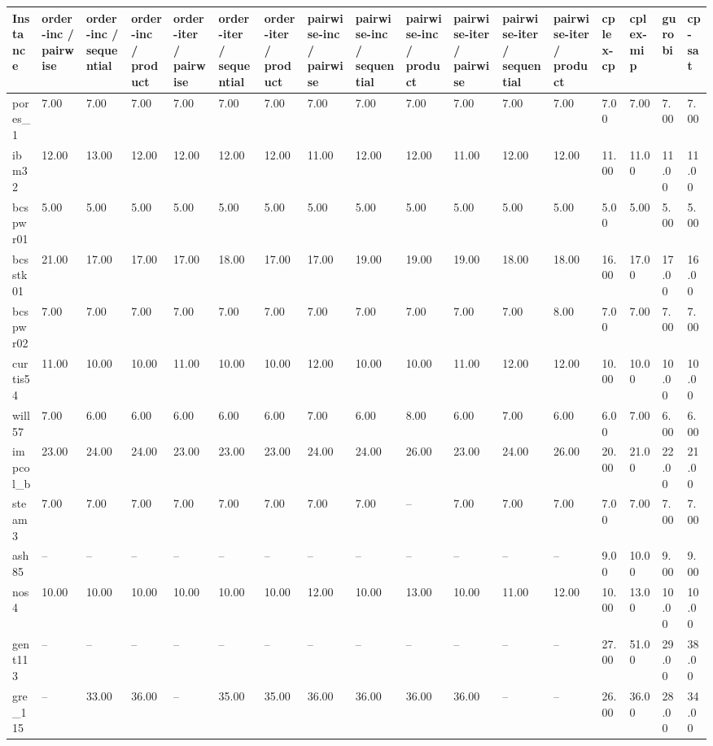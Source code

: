 \begin{tabular}{lllllllllllllllll}
\hline
Instance & order-inc / pairwise & order-inc / sequential & order-inc / product & order-iter / pairwise & order-iter / sequential & order-iter / product & pairwise-inc / pairwise & pairwise-inc / sequential & pairwise-inc / product & pairwise-iter / pairwise & pairwise-iter / sequential & pairwise-iter / product & cplex-cp & cplex-mip & gurobi & cp-sat \\
\hline
pores\_1 & 7.00 & 7.00 & 7.00 & 7.00 & 7.00 & 7.00 & 7.00 & 7.00 & 7.00 & 7.00 & 7.00 & 7.00 & 7.00 & 7.00 & 7.00 & 7.00 \\
ibm32 & 12.00 & 13.00 & 12.00 & 12.00 & 12.00 & 12.00 & 11.00 & 12.00 & 12.00 & 11.00 & 12.00 & 12.00 & 11.00 & 11.00 & 11.00 & 11.00 \\
bcspwr01 & 5.00 & 5.00 & 5.00 & 5.00 & 5.00 & 5.00 & 5.00 & 5.00 & 5.00 & 5.00 & 5.00 & 5.00 & 5.00 & 5.00 & 5.00 & 5.00 \\
bcsstk01 & 21.00 & 17.00 & 17.00 & 17.00 & 18.00 & 17.00 & 17.00 & 19.00 & 19.00 & 19.00 & 18.00 & 18.00 & 16.00 & 17.00 & 17.00 & 16.00 \\
bcspwr02 & 7.00 & 7.00 & 7.00 & 7.00 & 7.00 & 7.00 & 7.00 & 7.00 & 7.00 & 7.00 & 7.00 & 8.00 & 7.00 & 7.00 & 7.00 & 7.00 \\
curtis54 & 11.00 & 10.00 & 10.00 & 11.00 & 10.00 & 10.00 & 12.00 & 10.00 & 10.00 & 11.00 & 12.00 & 12.00 & 10.00 & 10.00 & 10.00 & 10.00 \\
will57 & 7.00 & 6.00 & 6.00 & 6.00 & 6.00 & 6.00 & 7.00 & 6.00 & 8.00 & 6.00 & 7.00 & 6.00 & 6.00 & 7.00 & 6.00 & 6.00 \\
impcol\_b & 23.00 & 24.00 & 24.00 & 23.00 & 23.00 & 23.00 & 24.00 & 24.00 & 26.00 & 23.00 & 24.00 & 26.00 & 20.00 & 21.00 & 22.00 & 21.00 \\
steam3 & 7.00 & 7.00 & 7.00 & 7.00 & 7.00 & 7.00 & 7.00 & 7.00 & -- & 7.00 & 7.00 & 7.00 & 7.00 & 7.00 & 7.00 & 7.00 \\
ash85 & -- & -- & -- & -- & -- & -- & -- & -- & -- & -- & -- & -- & 9.00 & 10.00 & 9.00 & 9.00 \\
nos4 & 10.00 & 10.00 & 10.00 & 10.00 & 10.00 & 10.00 & 12.00 & 10.00 & 13.00 & 10.00 & 11.00 & 12.00 & 10.00 & 13.00 & 10.00 & 10.00 \\
gent113 & -- & -- & -- & -- & -- & -- & -- & -- & -- & -- & -- & -- & 27.00 & 51.00 & 29.00 & 38.00 \\
gre\_115 & -- & 33.00 & 36.00 & -- & 35.00 & 35.00 & 36.00 & 36.00 & 36.00 & 36.00 & -- & -- & 26.00 & 36.00 & 28.00 & 34.00 \\

\end{tabular}

